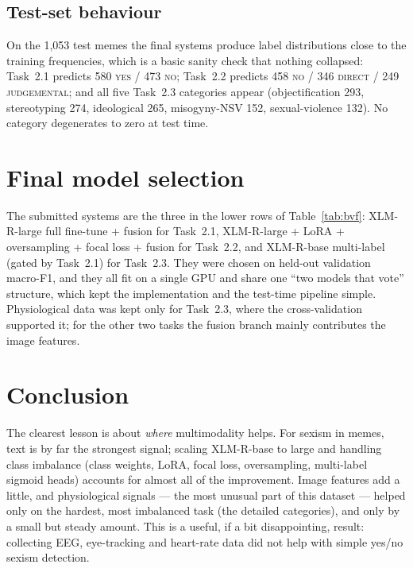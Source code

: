 \documentclass[11pt,a4paper]{article}
\begin{document}
\subsection{Test-set behaviour}
On the 1{,}053 test memes the final systems produce label distributions close to the training
frequencies, which is a basic sanity check that nothing collapsed: Task~2.1 predicts 580 \textsc{yes}
/ 473 \textsc{no}; Task~2.2 predicts 458 \textsc{no} / 346 \textsc{direct} / 249 \textsc{judgemental};
and all five Task~2.3 categories appear (objectification 293, stereotyping 274, ideological 265,
misogyny-NSV 152, sexual-violence 132). No category degenerates to zero at test time.

\section{Final model selection}
\label{sec:final}
The submitted systems are the three in the lower rows of Table~\ref{tab:bvf}: XLM-R-large full
fine-tune + fusion for Task~2.1, XLM-R-large + LoRA + oversampling + focal loss + fusion for
Task~2.2, and XLM-R-base multi-label (gated by Task~2.1) for Task~2.3. They were chosen on
held-out validation macro-F1, and they all fit on a single GPU and share one ``two models that
vote'' structure, which kept the implementation and the test-time pipeline simple. Physiological
data was kept only for Task~2.3, where the cross-validation supported it; for the other two tasks
the fusion branch mainly contributes the image features.

\section{Conclusion}
The clearest lesson is about \emph{where} multimodality helps. For sexism in memes, text is by far
the strongest signal; scaling XLM-R-base to large and handling class imbalance (class weights, LoRA,
focal loss, oversampling, multi-label sigmoid heads) accounts for almost all of the improvement.
Image features add a little, and physiological signals --- the most unusual part of this dataset ---
helped only on the hardest, most imbalanced task (the detailed categories), and only by a small but
steady amount. This is a useful, if a bit disappointing, result: collecting EEG, eye-tracking and
heart-rate data did not help with simple yes/no sexism detection.
\end{document}
